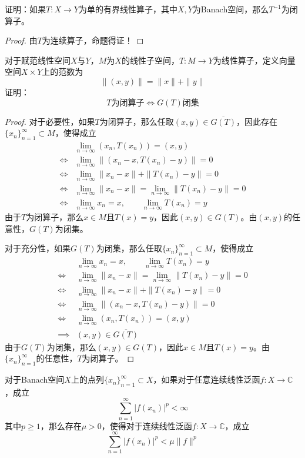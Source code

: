 \documentclass[lang = cn, scheme = chinese, 10pt]{elegantbook}
\newcommand{\C}{\mathbb{C}}  %
\newcommand{\sub}{\subset}   %
\begin{document}
\begin{proposition}
	证明：如果$T:X\to Y$为单的有界线性算子，其中$X,Y$为Banach空间，那么$T^{-1}$为闭算子。
\end{proposition}

\begin{proof}
	由$T$为连续算子，命题得证！
\end{proof}

\begin{proposition}
	对于赋范线性空间$X$与$Y$，$M$为$X$的线性子空间，$T:M\to Y$为线性算子，定义向量空间$X\times Y$上的范数为
	$$
	\|(x,y)\|=\|x\|+\|y\|
	$$
	证明：
	$$
	T\text{为闭算子}\iff G(T)\text{闭集}
	$$
\end{proposition}

\begin{proof}
	对于必要性，如果$T$为闭算子，那么任取$(x,y)\in \overline{G(T)}$，因此存在$\{x_n\}_{n=1}^{\infty}\sub M$，使得成立
	\begin{align*}
		& \lim_{n\to\infty}(x_n,T(x_n))=(x,y)\\
		\iff & \lim_{n\to\infty}\|(x_n-x,T(x_n)-y)\|=0\\
		\iff & \lim_{n\to\infty}\|x_n-x\|+\|T(x_n)-y\|=0\\
		\iff &  \lim_{n\to\infty}\|x_n-x\|=\lim_{n\to\infty}\|T(x_n)-y\|=0\\
		\iff & \lim_{n\to\infty}x_n=x,\qquad 
		\lim_{n\to\infty}T(x_n)=y
	\end{align*}
	由于$T$为闭算子，那么$x\in M$且$T(x)=y$，因此$(x,y)\in G(T)$。由$(x,y)$的任意性，$G(T)$为闭集。
	
	对于充分性，如果$G(T)$为闭集，那么任取$\{x_n\}_{n=1}^{\infty}\sub M$，使得成立
	\begin{align*}
		& \lim_{n\to\infty}x_n=x,\qquad 
		\lim_{n\to\infty}T(x_n)=y\\
		\iff &  \lim_{n\to\infty}\|x_n-x\|=\lim_{n\to\infty}\|T(x_n)-y\|=0\\
		\iff & \lim_{n\to\infty}\|x_n-x\|+\|T(x_n)-y\|=0\\
		\iff & \lim_{n\to\infty}\|(x_n-x,T(x_n)-y)\|=0\\
		\iff & \lim_{n\to\infty}(x_n,T(x_n))=(x,y)\\
		\implies& (x,y)\in \overline{G(T)}
	\end{align*}
	由于$G(T)$为闭集，那么$(x,y)\in G(T)$，因此$x\in M$且$T(x)=y$。由$\{x_n\}_{n=1}^{\infty}$的任意性，$T$为闭算子。
\end{proof}

\begin{proposition}
	对于Banach空间$X$上的点列$\{x_n\}_{n=1}^{\infty}\sub X$，如果对于任意连续线性泛函$f:X\to\C$，成立
	$$
	\sum_{n=1}^{\infty}|f(x_n)|^p<\infty
	$$
	其中$p\ge 1$，那么存在$\mu>0$，使得对于连续线性泛函$f:X\to\C$，成立
	$$
	\sum_{n=1}^{\infty}|f(x_n)|^p<\mu\|f\|^p
	$$
\end{proposition}
\end{document}
